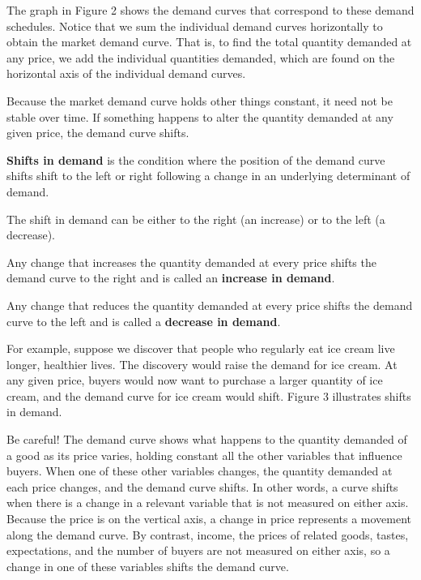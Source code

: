 The graph in Figure 2 shows the demand curves that correspond to these demand schedules. Notice that we sum the
individual demand curves horizontally to obtain the market demand curve. That is, to find the total quantity demanded
at any price, we add the individual quantities demanded, which are found on the horizontal axis of the individual
demand curves.
\ee

Because the market demand curve holds other things constant, it need not be stable over time. If something happens to
alter the quantity demanded at any given price, the demand curve shifts.

\textbf{Shifts in demand} is the condition where the position of the demand curve shifts shift to the left or right
following a change in an underlying determinant of demand.
\ed

The shift in demand can be either to the right (an increase) or to the left (a decrease).

Any change that increases the quantity demanded at every price shifts the demand curve to the right and is called an
\textbf{increase in demand}.
\ed

Any change that reduces the quantity demanded at every price shifts the demand curve to the left and is called a
\textbf{decrease in demand}.
\ed

\be
{}

For example, suppose we discover that people who regularly eat ice cream live longer, healthier lives. The discovery
would raise the demand for ice cream. At any given price, buyers would now want to purchase a larger quantity of ice
cream, and the demand curve for ice cream would shift. Figure 3 illustrates shifts in demand.
\ee

Be careful! The demand curve shows what happens to the quantity demanded of a good as its price varies, holding
constant all the other variables that influence buyers. When one of these other variables changes, the quantity
demanded at each price changes, and the demand curve shifts. In other words, a curve shifts when there is a change in
a relevant variable that is not measured on either axis. Because the price is on the vertical axis, a change in price
represents a movement along the demand curve. By contrast, income, the prices of related goods, tastes, expectations,
and the number of buyers are not measured on either axis, so a change in one of these variables shifts the demand curve.

